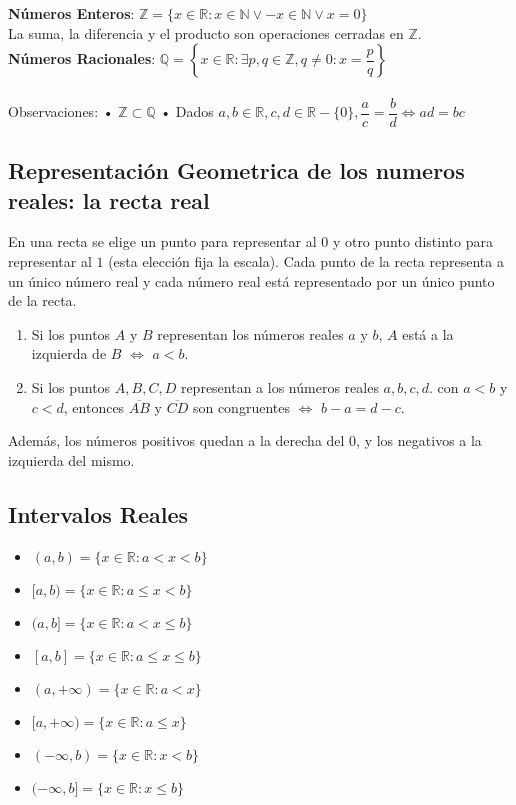\documentclass[11pt,a4paper]{article}
\begin{document}
\noindent \textbf{N\'umeros Enteros}: $\mathbb{Z} = \{ x \in \mathbb{R} : x \in \mathbb{N} \lor -x \in \mathbb{N} \lor x = 0 \}$\\
\indent La suma, la diferencia y el producto son operaciones cerradas en $\mathbb{Z}$.\\

\noindent \textbf{N\'umeros Racionales}: $\mathbb{Q} = \left\{ x \in \mathbb{R} : \exists p, q \in \mathbb{Z}, q \not = 0 : x = \dfrac{p}{q} \right\}$\\

\noindent \dotfill\\
Observaciones: • $\mathbb{Z} \subset \mathbb{Q}$ • Dados $a,b \in \mathbb{R}, c,d \in \mathbb{R}-\{0\}, \dfrac{a}{c} = \dfrac{b}{d} \iff ad=bc$
\subsection{Representaci\'on Geometrica de los numeros reales: la recta real}
En una recta se elige un punto para representar al $0$ y otro punto distinto para representar al $1$ (esta elecci\'on fija la escala). Cada punto de la recta representa a un \'unico n\'umero real y cada n\'umero real est\'a representado por un \'unico punto de la recta.
\begin{enumerate}
\item Si los puntos $A$ y $B$ representan los n\'umeros reales $a$ y $b$, $A$ est\'a a la izquierda de $B$ $\iff$ $a<b$.
\item Si los puntos $A,B,C,D$ representan a los n\'umeros reales $a,b,c,d$. con $a<b$ y $c<d$, entonces $\overline{AB}$ y $\overline{CD}$ son congruentes $\iff$ $b-a = d - c$.
\end{enumerate}
Adem\'as, los n\'umeros positivos quedan a la derecha del $0$, y los negativos a la izquierda del mismo.

\subsection{Intervalos Reales}
\begin{multicols}{2}
\begin{itemize}
\item $(a,b) = \{ x \in \mathbb{R} : a < x < b \}$
\item $[a,b) = \{ x \in \mathbb{R} : a \leq x < b \}$
\item $(a,b] = \{ x \in \mathbb{R} : a < x \leq b \}$
\item $[a,b] = \{ x \in \mathbb{R} : a \leq x \leq b \}$

\item $(a,+\infty) = \{ x \in \mathbb{R} : a < x \}$
\item $[a,+\infty) = \{ x \in \mathbb{R} : a \leq x \}$
\item $(-\infty,b) = \{ x \in \mathbb{R} : x < b \}$
\item $(-\infty,b] = \{ x \in \mathbb{R} : x \leq b \}$
\end{itemize}
\end{multicols}
\end{document}
